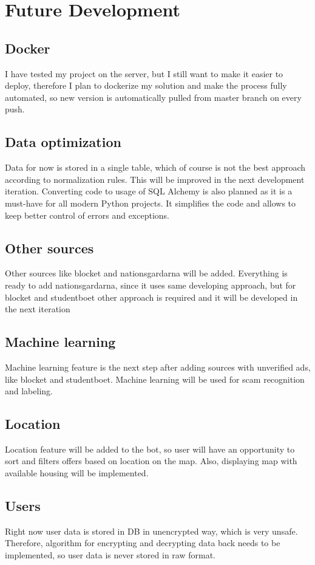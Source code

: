 \documentclass[a4paper,11pt]{article}
\begin{document}
\section{Future Development}
\subsection{Docker}I have tested my project on the server, but I still want to make it easier to deploy, therefore I plan to dockerize my solution and make the process fully automated, so new version is automatically pulled from master branch on every push.
\subsection{Data optimization} Data for now is stored in a single table, which of course is not the best approach according to normalization rules. This will be improved in the next development iteration. Converting code to usage of SQL Alchemy is also planned as it is a must-have for all modern Python projects. It simplifies the code and allows to keep better control of errors and exceptions.
\subsection{Other sources} Other sources like blocket and nationsgardarna will be added. Everything is ready to add nationsgardarna, since it uses same developing approach, but for blocket and studentboet other approach is required and it will be developed in the next iteration
\subsection{Machine learning} Machine learning feature is the next step after adding sources with unverified ads, like blocket and studentboet. Machine learning will be used for scam recognition and labeling. 
\subsection{Location} Location feature will be added to the bot, so user will have an opportunity to sort and filters offers based on location on the map. Also, displaying map with available housing will be implemented.
\subsection{Users} Right now user data is stored in DB in unencrypted way, which is very unsafe. Therefore, algorithm for encrypting and decrypting data back needs to be implemented, so user data is never stored in raw format.
\end{document}

